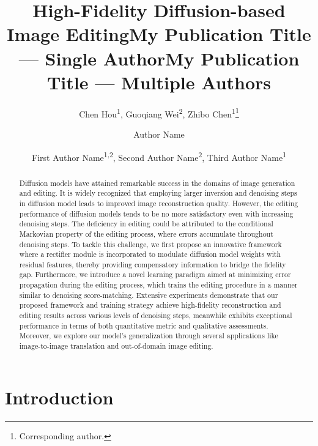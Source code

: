 \documentclass[letterpaper]{article} %
\title{High-Fidelity Diffusion-based Image Editing}
\author{
    Chen Hou\textsuperscript{\rm 1},
    Guoqiang Wei\textsuperscript{\rm 2},
    Zhibo Chen\textsuperscript{\rm 1}\thanks{Corresponding author.}
}
\title{My Publication Title --- Single Author}
\author {
    Author Name
}
\title{My Publication Title --- Multiple Authors}
\author {
    First Author Name\textsuperscript{\rm 1,\rm 2},
    Second Author Name\textsuperscript{\rm 2},
    Third Author Name\textsuperscript{\rm 1}
}
\begin{document}
\maketitle

\begin{abstract}
Diffusion models have attained remarkable success in the domains of image generation and editing. It is widely recognized that employing larger inversion and denoising steps in diffusion model leads to improved image reconstruction quality. However, the editing performance of diffusion models tends to be no more satisfactory even with increasing denoising steps.
The deficiency in editing could be attributed to the conditional Markovian property of the editing process, where errors accumulate throughout denoising steps. 
To tackle this challenge, we first propose an innovative framework where a rectifier module is incorporated to modulate diffusion model weights with residual features, thereby providing compensatory information to bridge the fidelity gap. 
Furthermore, we introduce a novel learning paradigm aimed at minimizing error propagation during the editing process, which trains the editing procedure in a manner similar to denoising score-matching. 
Extensive experiments demonstrate that our proposed framework and training strategy achieve high-fidelity reconstruction and editing results across various levels of denoising steps, meanwhile exhibits exceptional performance in terms of both quantitative metric and qualitative assessments. 
Moreover, we explore our model's generalization through several applications like image-to-image translation and out-of-domain image editing.
\end{abstract}

\section{Introduction}
\end{document}
